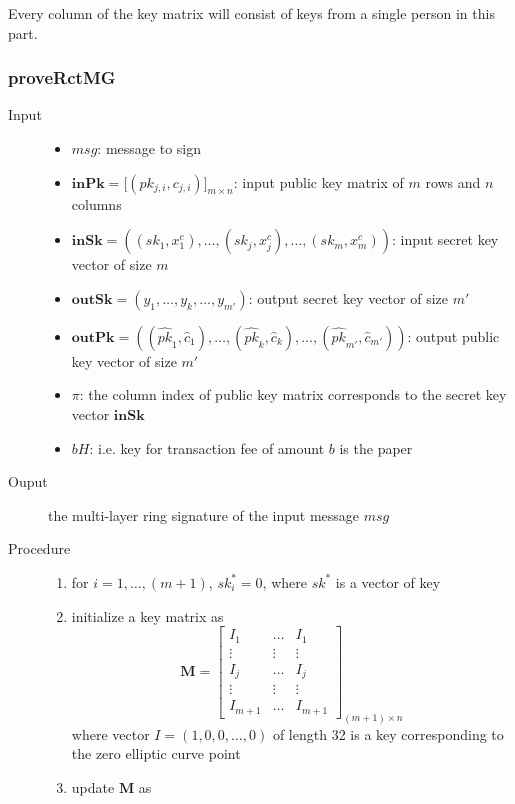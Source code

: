 Every column of the key matrix will consist of keys from a single person in this part.
\subsubsection{proveRctMG}\label{proveRctMG}
	\begin{description}
		\item[Input]  
			\begin{itemize}
				\item \(msg\): message to sign
				\item \(\mathbf{inPk}=\Big[(pk_{j,i},c_{j,i})\Big]_{m\times n}\): input public key matrix of \(m\) rows and \(n\) columns
				\item \(\mathbf{inSk}=\left((sk_1,x_1^c),\dots,(sk_j,x_j^c),\dots,(sk_m,x_m^c)\right)\): input secret key vector of size \(m\)
				\item \(\mathbf{outSk}=(y_1,\dots,y_k,\dots,y_{m'})\): output secret key vector of size \(m'\)
				\item \(\mathbf{outPk}=\left((\hat{pk}_1,\hat{c}_1),\dots,(\hat{pk}_k,\hat{c}_k),\dots,(\hat{pk}_{m'},\hat{c}_{m'})\right)\): output public key vector of size \(m'\)
				\item \(\pi\): the column index of public key matrix corresponds to the secret key vector \(\mathbf{inSk}\)
				\item \(bH\): i.e. key for transaction fee of amount \(b\) is the paper
			\end{itemize}
		\item[Ouput] the multi-layer ring signature of the input message \(msg\)
		\item[Procedure]
			\begin{enumerate}
				\item for \(i=1,\dots,(m+1)\), \(sk_i^*=0\), where \(sk^*\) is a vector of key
				\item initialize a key matrix as 
					\[
						\mathbf{M}=\begin{bmatrix}
							I_1 &\dots &I_1 \\
							\vdots &\vdots &\vdots \\
							I_j &\dots &I_j \\
							\vdots &\vdots &\vdots \\
							I_{m+1} &\dots &I_{m+1}
						\end{bmatrix}_{(m+1)\times n}
					\]
					where vector \(I=(1,0,0,\dots,0)\) of length 32 is a key corresponding to the zero elliptic curve point
				\item update \(\mathbf{M}\) as  

\end{enumerate}
\end{description}
